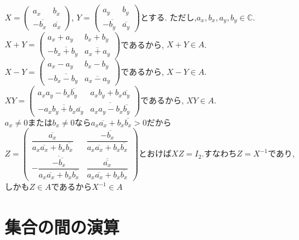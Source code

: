 \documentclass{jsarticle}
\begin{document}
\subsection{}	%
$X = \left( \begin{array}{rr}a_x & b_x\\ -\overline{b_x} & \overline{a_x}\end{array}\right)$,
$Y = \left( \begin{array}{rr}a_y & b_y\\ -\overline{b_y} & \overline{a_y}\end{array}\right)$とする.
ただし,$a_x, b_x, a_y, b_y \in \mathbb{C}$.\\
$X + Y = \left( \begin{array}{rr}a_x + a_y & b_x + b_y\\ -\overline{b_x + b_y} & \overline{a_x + a_y}\end{array}\right)$であるから, $X + Y \in A$.\\
$X - Y = \left( \begin{array}{rr}a_x - a_y & b_x - b_y\\ -\overline{b_x - b_y} & \overline{a_x - a_y}\end{array}\right)$であるから, $X - Y \in A$.\\
$XY = \left( \begin{array}{rr}a_xa_y - b_x\overline{b_y} & a_xb_y + b_x\overline{a_y}\\ -\overline{a_xb_y + b_x\overline{a_y}} & \overline{a_xa_y - b_x\overline{b_y}}\end{array}\right)$であるから, $XY \in A$.\\
$a_x \neq 0$または$b_x \neq 0$なら$a_x\overline{a_x} + b_x\overline{b_x} > 0$だから
$Z = \left( \begin{array}{rr}\dfrac{\overline{a_x}}{a_x\overline{a_x} + b_x\overline{b_x}} & \dfrac{-\overline{b_x}}{a_x\overline{a_x} + b_x\overline{b_x}}\\ -\overline{\dfrac{-\overline{b_x}}{a_x\overline{a_x} + b_x\overline{b_x}}} & \overline{\dfrac{\overline{a_x}}{a_x\overline{a_x} + b_x\overline{b_x}}}\end{array}\right)$とおけば$XZ = I_2$.すなわち$Z = X^{-1}$であり,しかも$Z \in A$であるから$X^{-1} \in A$


\section{集合の間の演算} %
\end{document}
